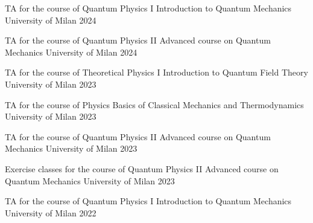 
\begin{cvhonors}

    \cvhonor
    {TA for the course of Quantum Physics I} %
    {Introduction to Quantum Mechanics}
    {University of Milan} %
    {2024}

    \cvhonor
    {TA for the course of Quantum Physics II} %
    {Advanced course on Quantum Mechanics}
    {University of Milan} %
    {2024}

    \cvhonor
    {TA for the course of Theoretical Physics I} %
    {Introduction to Quantum Field Theory}
    {University of Milan} %
    {2023}

    \cvhonor
    {TA for the course of Physics} %
    {Basics of Classical Mechanics and Thermodynamics}
    {University of Milan} %
    {2023}

    \cvhonor
    {TA for the course of Quantum Physics II} %
    {Advanced course on Quantum Mechanics}
    {University of Milan} %
    {2023}

    \cvhonor
    {Exercise classes for the course of Quantum Physics II} %
    {Advanced course on Quantum Mechanics}
    {University of Milan} %
    {2023}

    \cvhonor
    {TA for the course of Quantum Physics I} %
    {Introduction to Quantum Mechanics}
    {University of Milan} %
    {2022}

    
    


\end{cvhonors}
